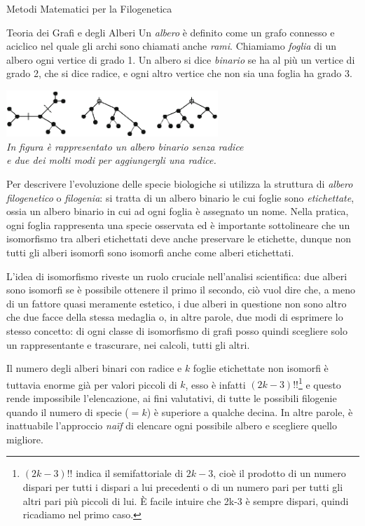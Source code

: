 \documentclass{article}
\begin{document}
\begin{section}{Metodi Matematici per la Filogenetica}
\begin{subsection}{Teoria dei Grafi e degli Alberi}
			Un \emph{albero} è definito come un grafo connesso e aciclico nel quale gli archi sono chiamati anche \emph{rami}. Chiamiamo \emph{foglia} di un albero ogni vertice di grado 1. Un albero si dice \emph{binario} se ha al più un vertice di grado 2, che si dice radice, e ogni altro vertice che non sia una foglia ha grado 3. 
				\begin{center}
					\vspace{6pt}
					\includegraphics[width=0.6\textwidth]{Pics/rooted1.png}
					\\ \vspace{6pt}
					\emph{In figura è rappresentato un albero binario senza radice \\ e due dei molti modi per aggiungergli una radice.}
					\vspace{6pt}
				\end{center}
			
			Per descrivere l’evoluzione delle specie biologiche si utilizza la struttura di \emph{albero filogenetico} o \emph{filogenia}: si tratta di un albero binario le cui foglie sono \emph{etichettate}, ossia un albero binario in cui ad ogni foglia è assegnato un nome. Nella pratica, ogni foglia rappresenta una specie osservata ed è importante sottolineare che un isomorfismo tra alberi etichettati deve anche preservare le etichette, dunque non tutti gli alberi isomorfi sono isomorfi anche come alberi etichettati. 
			
			L’idea di isomorfismo riveste un ruolo cruciale nell’analisi scientifica: due alberi sono isomorfi se è possibile ottenere il primo  il secondo, ciò vuol dire che, a meno di un fattore quasi meramente estetico, i due alberi in questione non sono altro che due facce della stessa medaglia o, in altre parole, due modi di esprimere lo stesso concetto: di ogni classe di isomorfismo di grafi posso quindi scegliere solo un rappresentante e trascurare, nei calcoli, tutti gli altri. 
			
			Il numero degli alberi binari con radice e $k$ foglie etichettate non isomorfi è tuttavia enorme già per valori piccoli di $k$, esso è infatti $(2k-3)!!$\footnote{$(2k-3)!!$ indica il semifattoriale di $2k-3$, cioè il prodotto di un numero dispari per tutti i dispari a lui precedenti o di un numero pari per tutti gli altri pari più piccoli di lui. È facile intuire che 2k-3 è sempre dispari, quindi ricadiamo nel primo caso.} e questo rende impossibile l’elencazione, ai fini valutativi, di tutte le possibili filogenie quando il numero di specie ($=k$) è superiore a qualche decina. In altre parole, è inattuabile l'approccio \emph{naïf} di elencare ogni possibile albero e scegliere  quello migliore.
		\end{subsection}
		

\end{section}
\end{document}
